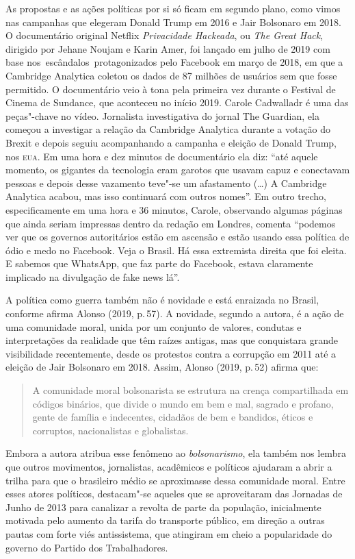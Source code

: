 As propostas e as ações políticas por si só ficam em segundo plano, como
vimos nas campanhas que elegeram Donald Trump em 2016 e Jair Bolsonaro
em 2018. O documentário original Netflix \textit{Privacidade Hackeada}, ou \textit{The Great
Hack}, dirigido por Jehane Noujam e Karin Amer, foi lançado em julho de
2019 com base nos~escândalos~protagonizados pelo Facebook em março de
2018, em que a Cambridge Analytica coletou os dados de 87 milhões de
usuários sem que fosse permitido. O documentário veio à tona pela
primeira vez durante o Festival de Cinema de Sundance, que aconteceu no
início 2019. Carole Cadwalladr é uma das peças"-chave no vídeo.
Jornalista investigativa do jornal The Guardian, ela começou a
investigar a relação da Cambridge Analytica durante a votação do Brexit
e depois seguiu acompanhando a campanha e eleição de Donald Trump, nos
\textsc{eua}. Em uma hora e dez minutos de documentário ela diz: ``até aquele
momento, os gigantes da tecnologia eram garotos que usavam capuz e
conectavam pessoas e depois desse vazamento teve"-se um afastamento (\ldots{})
A Cambridge Analytica acabou, mas isso continuará com outros nomes''. Em
outro trecho, especificamente em uma hora e 36 minutos, Carole, observando algumas páginas que ainda seriam impressas dentro da
redação em Londres, comenta ``podemos ver que os governos autoritários
estão em ascensão e estão usando essa política de ódio e medo no
Facebook. Veja o Brasil. Há essa extremista direita que foi eleita. E
sabemos que WhatsApp, que faz parte do Facebook, estava claramente
implicado na divulgação de fake news lá''.

A política como guerra também não é novidade e está enraizada no Brasil,
conforme afirma Alonso (2019, p.\,57). A novidade, segundo a autora, é a
ação de uma comunidade moral, unida por um conjunto de valores, condutas
e interpretações da realidade que têm raízes antigas, mas que
conquistara grande visibilidade recentemente, desde os protestos contra
a corrupção em 2011 até a eleição de Jair Bolsonaro em 2018. Assim,
Alonso (2019, p.\,52) afirma que:

\begin{quote}
A comunidade moral bolsonarista se estrutura na crença compartilhada em
códigos binários, que divide o mundo em bem e mal, sagrado e profano,
gente de família e indecentes, cidadãos de bem e bandidos, éticos e
corruptos, nacionalistas e globalistas.
\end{quote}

Embora a autora atribua esse fenômeno ao \textit{bolsonarismo}, ela também
nos lembra que outros movimentos, jornalistas, acadêmicos e políticos
ajudaram a abrir a trilha para que o brasileiro médio se aproximasse
dessa comunidade moral. Entre esses atores políticos, destacam"-se
aqueles que se aproveitaram das Jornadas de Junho de 2013 para canalizar
a revolta de parte da população, inicialmente motivada pelo aumento da
tarifa do transporte público, em direção a outras pautas com forte viés
antissistema, que atingiram em cheio a popularidade do governo do
Partido dos Trabalhadores.

